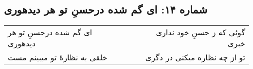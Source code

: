 \begin{center}
\section*{شماره ۱۴: ای گم شده درحسنِ تو هر دیدهوری}
\label{sec:014}
\begin{longtable}{l p{0.5cm} r}
ای گم شده درحسنِ تو هر دیدهوری
&&
گوئی که ز حسنِ خود نداری خبری
\\
خلقی به نظارهٔ تو میبینم مست
&&
تو از چه نظاره میکنی در دگری
\\
\end{longtable}
\end{center}
